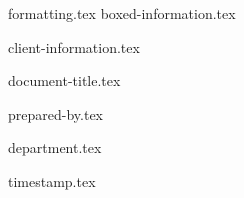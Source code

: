 \begin{samepage}
    \thispagestyle{firstpage}

    \newcommand{\LargeFont}{\Large}

    {formatting.tex}
    {boxed-information.tex}

    \begin{center}
        \setlength{\parskip}{1.0\baselineskip}
        \setlength{\parindent}{0pt}

        {client-information.tex}

        {document-title.tex}

        {prepared-by.tex}

        {department.tex}

        {timestamp.tex}
    \end{center}
\end{samepage}